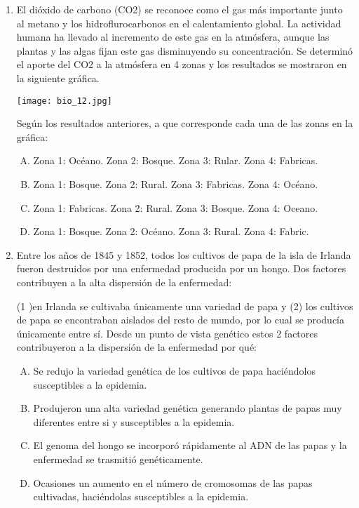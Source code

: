 \begin{enumerate}
\item El dióxido de carbono (CO2) se reconoce  como el gas  más  importante junto al  metano  y los   hidroflurocarbonos  en el calentamiento global. La actividad  humana  ha llevado  al    incremento de  este gas en la atmósfera, aunque las plantas y las algas fijan este gas  disminuyendo su  concentración.  Se determinó  el aporte del CO2  a la atmósfera en 4  zonas y los resultados se mostraron  en la siguiente gráfica. \label{bio-19}

\begin{flushleft}
\texttt{[image: bio\_12.jpg]} 
\end{flushleft}

Según los resultados anteriores,  a  que corresponde   cada  una de las zonas en la gráfica: 

\begin{enumerate}[(A)]
\item Zona 1: Océano.   Zona 2: Bosque. Zona 3: Rular.    Zona 4: Fabricas.
\item Zona 1: Bosque.   Zona 2: Rural.  Zona 3: Fabricas. Zona 4: Océano.
\item Zona 1: Fabricas. Zona 2: Rural.  Zona 3: Bosque.   Zona 4: Oceano.
\item Zona 1: Bosque.   Zona 2: Océano. Zona 3: Rural.    Zona 4: Fabric.
\end{enumerate}


\item Entre  los  años  de  1845 y 1852, todos  los  cultivos  de papa  de  la isla de  Irlanda  fueron   destruidos por  una enfermedad  producida por un  hongo. Dos factores  contribuyen  a la  alta  dispersión de  la  enfermedad: \label{bio-20}

(1 )en Irlanda  se cultivaba únicamente una variedad de papa y  (2) los  cultivos  de papa  se  encontraban aislados del resto de  mundo, por lo  cual se producía únicamente entre sí.
Desde un punto de  vista genético estos  2  factores contribuyeron  a la dispersión de la enfermedad por qué:

\begin{enumerate}[(A)]
\item Se  redujo  la variedad  genética de los cultivos  de papa  haciéndolos susceptibles a la epidemia.
\item Produjeron una alta  variedad  genética  generando plantas  de  papas  muy  diferentes entre  si  y  susceptibles  a la epidemia.
\item El genoma     del  hongo  se incorporó rápidamente  al  ADN  de las papas y la enfermedad  se trasmitió genéticamente.
\item Ocasiones  un   aumento  en  el número  de  cromosomas  de  las  papas  cultivadas, haciéndolas    susceptibles  a   la  epidemia.
\end{enumerate}



\end{enumerate}
